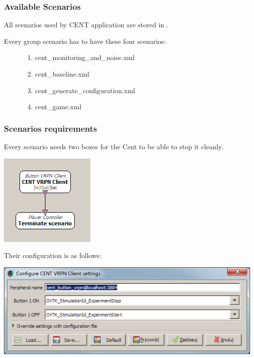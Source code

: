 \documentclass[letterpaper,10pt,english]{sphinxmanual}
\begin{document}
\subsubsection{Available Scenarios}
\label{index:available-scenarios}
All scenarios used by CENT application are stored in .
\begin{description}
\item[{Every group scenario has to have these four scenarios:}] \leavevmode\begin{enumerate}
\item {} 
cent\_monitoring\_and\_noise.xml

\item {} 
cent\_baseline.xml

\item {} 
cent\_generate\_configuration.xml

\item {} 
cent\_game.xml

\end{enumerate}

\end{description}


\subsubsection{Scenarios requirements}
\label{index:scenarios-requirements}
Every scenario needs two boxes for the Cent to be able to stop it cleanly.

\includegraphics{CentTerminateScenarioBoxes.png}

Their configuration is as follows:

\includegraphics{OVCentVRPNClientConf.png}
\end{document}

